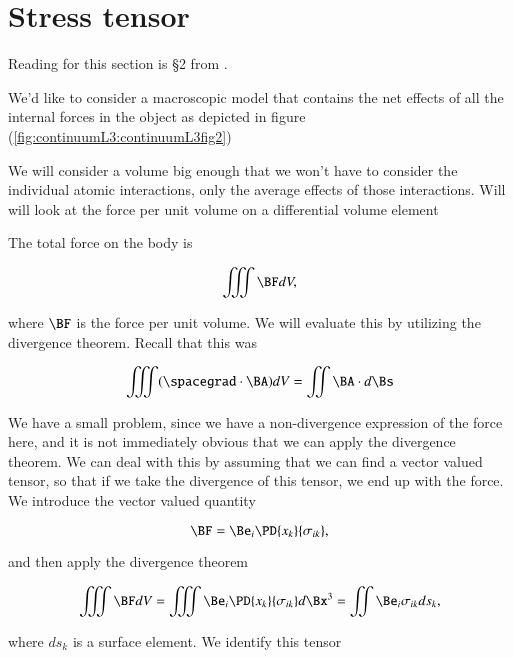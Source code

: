 \section{Stress tensor}

Reading for this section is \S 2 from \citep{landau1960theory}.

We'd like to consider a macroscopic model that contains the net effects of all the internal forces in the object as depicted in figure (\ref{fig:continuumL3:continuumL3fig2})


We will consider a volume big enough that we won't have to consider the individual atomic interactions, only the average effects of those interactions.  Will will look at the force per unit volume on a differential volume element

The total force on the body is 

\begin{equation}\label{eqn:continuumL3:230}
\iiint \BF dV,
\end{equation}

where $\BF$ is the force per unit volume.  We will evaluate this by utilizing the divergence theorem.  Recall that this was

\begin{equation}\label{eqn:continuumL3:250}
\iiint (\spacegrad \cdot \BA) dV
= \iint \BA \cdot d\Bs
\end{equation}

We have a small problem, since we have a non-divergence expression of the force here, and it is not immediately obvious that we can apply the divergence theorem.  We can deal with this by assuming that we can find a vector valued tensor, so that if we take the divergence of this tensor, we end up with the force.  We introduce the vector valued quantity

\begin{equation}\label{eqn:continuumL3:270}
\BF = \Be_i \PD{x_k}{\sigma_{ik}},
\end{equation}

and then apply the divergence theorem

\begin{equation}\label{eqn:continuumL3:290}
\iiint \BF dV 
= \iiint \Be_i \PD{x_k}{\sigma_{ik}} d\Bx^3 
=
\iint \Be_i \sigma_{ik} ds_k,
\end{equation}

where $ds_k$ is a surface element.  We identify this tensor

